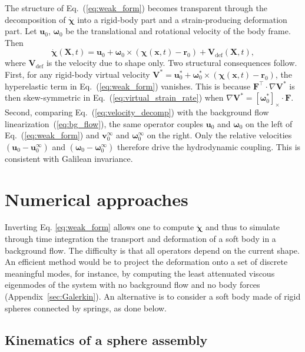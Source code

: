 \documentclass[aps,prfluids,groupedaddress]{revtex4-2}
\newcommand{\br}{\bm{r}}
\newcommand{\bu}{\bm{u}}
\newcommand{\bv}{\bm{v}}
\newcommand{\bx}{\bm{x}}
\newcommand{\bchi}{\bm{\chi}}
\newcommand{\bomega}{\bm{\omega}}
\newcommand{\bV}{\bm{V}}
\newcommand{\bX}{\bm{X}}
\newcommand{\tF}{\bm{{F}}}
\newcommand{\bxd}{\bm{\dot \chi}}
\begin{document}
The structure of Eq.~(\ref{eq:weak_form}) becomes transparent through the decomposition of $\bxd$ into a rigid-body part and a strain-producing deformation part. Let $\bu_0$, $\bomega_0$ be the translational and rotational velocity of the body frame. Then
\begin{equation}\label{eq:velocity_decomp}
\bxd(\bX,t) = \bu_0 + \bomega_0\times\left(\bchi(\bx,t)-\br_0\right) + \bV_\mathrm{def}(\bX,t),
\end{equation}
where $\bV_\mathrm{def}$ is the velocity due to shape only.
Two structural consequences follow. First, for any rigid-body virtual velocity $\bV^* = \bu_0^* + \bomega_0^*\times\left(\bchi(\bx,t)-\br_0\right)$, the hyperelastic term in Eq.~(\ref{eq:weak_form}) vanishes. This is because  $\tF^\top \cdot \nabla \bV^*$ is then skew-symmetric in Eq.~(\ref{eq:virtual_strain_rate}) when $\nabla\bV^* = [\bomega_0^*]_\times\cdot\tF$.
Second, comparing Eq.~(\ref{eq:velocity_decomp}) with the background flow linearization~(\ref{eq:bg_flow}), the same operator couples $\bu_0$ and $\bomega_0$ on the left of Eq.~(\ref{eq:weak_form}) and $\bv_0^\infty$ and $\bomega_0^\infty$ on the right. Only the relative velocities $(\bu_0 - \bu_0^\infty)$ and $(\bomega_0 - \bomega_0^\infty)$ therefore drive the hydrodynamic coupling. This is consistent with Galilean invariance.


\section{Numerical approaches\label{sec.numerics}}


Inverting Eq. \eqref{eq:weak_form} allows one to compute $\bxd$ and thus to simulate through time integration the transport and deformation of a soft body in a background flow. 
The difficulty is that all operators depend on the current shape. An efficient method would be to project the deformation onto a set of discrete meaningful modes, for instance, by computing the least attenuated viscous eigenmodes of the system with no background flow and no body forces (Appendix~\ref{sec:Galerkin}). 
An alternative is to consider a soft body made of rigid spheres connected by springs, as done below. 


\subsection{Kinematics of a sphere assembly\label{sec.kinematics}}
\end{document}
